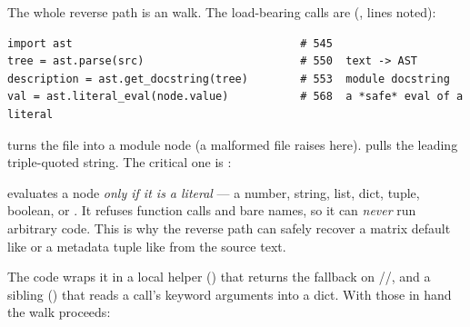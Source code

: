 The whole reverse path is an  walk. The load-bearing calls are
(, lines noted):

\begin{lstlisting}
import ast                                   # 545
tree = ast.parse(src)                        # 550  text -> AST
description = ast.get_docstring(tree)        # 553  module docstring
val = ast.literal_eval(node.value)           # 568  a *safe* eval of a literal
\end{lstlisting}

 turns the file into a module node (a malformed file raises
 here).  pulls the leading
triple-quoted string. The critical one is :

\begin{defn}
 evaluates a node \emph{only if it is a literal} ---
a number, string, list, dict, tuple, boolean, or . It refuses function
calls and bare names, so it can \emph{never} run arbitrary code. This is why the
reverse path can safely recover a matrix default like \code{[[2,3],[1,3]]} or a
metadata tuple like  from the source text.
\end{defn}

The code wraps it in a local helper 
() that returns the fallback on
//, and a sibling
 () that reads a call's keyword arguments into
a dict. With those in hand the walk proceeds:

